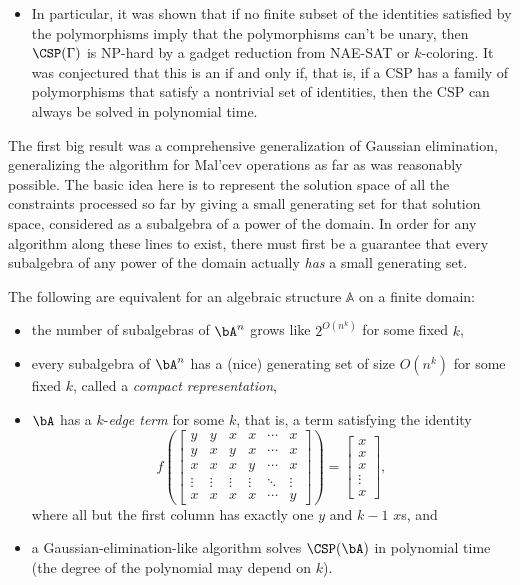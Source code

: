 \begin{itemize}
\item In particular, it was shown that if no finite subset of the identities satisfied by the polymorphisms imply that the polymorphisms can't be unary, then $\CSP(\Gamma)$ is NP-hard by a gadget reduction from NAE-SAT or $k$-coloring. It was conjectured that this is an if and only if, that is, if a CSP has a family of polymorphisms that satisfy a nontrivial set of identities, then the CSP can always be solved in polynomial time.
\end{itemize}

The first big result was a comprehensive generalization of Gaussian elimination, generalizing the algorithm for Mal'cev operations as far as was reasonably possible. The basic idea here is to represent the solution space of all the constraints processed so far by giving a small generating set for that solution space, considered as a subalgebra of a power of the domain. In order for any algorithm along these lines to exist, there must first be a guarantee that every subalgebra of any power of the domain actually \emph{has} a small generating set.

\begin{thm} The following are equivalent for an algebraic structure $\mathbb{A}$ on a finite domain:
\begin{itemize}
\item the number of subalgebras of $\bA^n$ grows like $2^{O(n^k)}$ for some fixed $k$,

\item every subalgebra of $\bA^n$ has a (nice) generating set of size $O(n^k)$ for some fixed $k$, called a \emph{compact representation},

\item $\bA$ has a $k$-\emph{edge term} for some $k$, that is, a term satisfying the identity
\[
f\left(\begin{bmatrix}y & y & x & x & \cdots & x\\ y & x & y & x & \cdots & x\\ x & x & x & y & \cdots & x\\ \vdots & \vdots & \vdots & \vdots & \ddots & \vdots \\ x & x & x & x & \cdots & y \end{bmatrix}\right) = \begin{bmatrix}x\\ x\\ x\\ \vdots \\ x\end{bmatrix},
\]
where all but the first column has exactly one $y$ and $k-1$ $x$s, and

\item a Gaussian-elimination-like algorithm solves $\CSP(\bA)$ in polynomial time (the degree of the polynomial may depend on $k$).
\end{itemize}
\end{thm}

